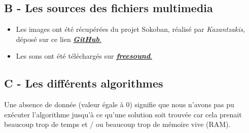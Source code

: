 \documentclass[a4paper,12pt]{article} %
\begin{document}
\subsection*{B - Les sources des fichiers multimedia}
\begin{itemize}
	\item Les images ont été récupérées du projet Sokoban, réalisé par \emph{Kazantzakis}, déposé sur ce lien \href{https://github.com/kazantzakis/pySokoban}{\textbf{\emph{GitHub}}.}
	\item Les sons ont été téléchargés sur \href{https://freesound.org/}{\textbf{\emph{freesound}}.}
\end{itemize}
\subsection*{C - Les différents algorithmes}
\label{algorithme}
Une absence de donnée (valeur égale à 0) signifie que nous n'avons pas pu exécuter l'algorithme jusqu'à ce qu'une solution soit trouvée car cela prenait beaucoup trop de temps et / ou beaucoup trop de mémoire vive (RAM).
\end{document}
